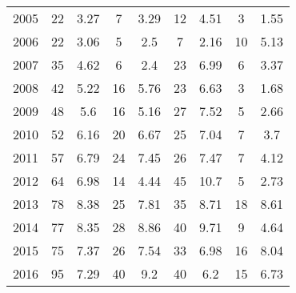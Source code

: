 \begin{table}[htbp]
\begin{tabular}{l*{8}{c}}
2005      &       22&     3.27&        7&     3.29&       12&     4.51&        3&     1.55\\
2006      &       22&     3.06&        5&      2.5&        7&     2.16&       10&     5.13\\
2007      &       35&     4.62&        6&      2.4&       23&     6.99&        6&     3.37\\
2008      &       42&     5.22&       16&     5.76&       23&     6.63&        3&     1.68\\
2009      &       48&      5.6&       16&     5.16&       27&     7.52&        5&     2.66\\
2010      &       52&     6.16&       20&     6.67&       25&     7.04&        7&      3.7\\
2011      &       57&     6.79&       24&     7.45&       26&     7.47&        7&     4.12\\
2012      &       64&     6.98&       14&     4.44&       45&     10.7&        5&     2.73\\
2013      &       78&     8.38&       25&     7.81&       35&     8.71&       18&     8.61\\
2014      &       77&     8.35&       28&     8.86&       40&     9.71&        9&     4.64\\
2015      &       75&     7.37&       26&     7.54&       33&     6.98&       16&     8.04\\
2016      &       95&     7.29&       40&      9.2&       40&      6.2&       15&     6.73\\
\hline\hline
\end{tabular}
\end{table}
